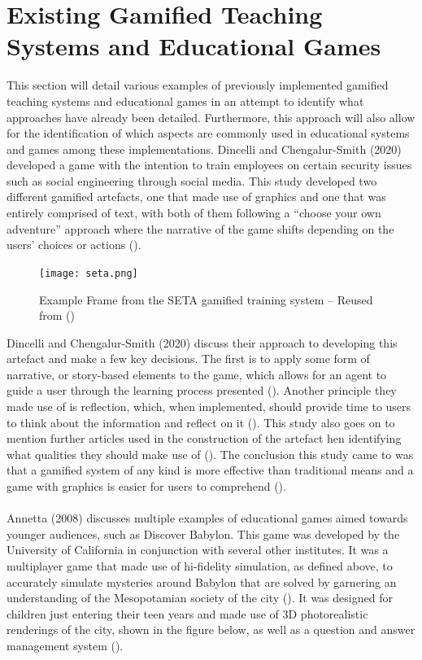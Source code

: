 \section{Existing Gamified Teaching Systems and Educational Games}
This section will detail various examples of previously implemented gamified teaching systems and educational games in an attempt to identify what approaches have already been detailed. Furthermore, this approach will also allow for the identification of which aspects are commonly used in educational systems and games among these implementations. 
\newpage
\noindent Dincelli and Chengalur-Smith (2020) developed a game with the intention to train employees on certain security issues such as social engineering through social media. This study developed two different gamified artefacts, one that made use of graphics and one that was entirely comprised of text, with both of them following a “choose your own adventure” approach where the narrative of the game shifts depending on the users’ choices or actions (\cite{Dincelli2020}).

\begin{figure}[H]
\centering
\centerline{\texttt{[image: seta.png]}}
\caption{Example Frame from the SETA gamified training system – Reused from (\cite{Dincelli2020})}
\end{figure}

\noindent Dincelli and Chengalur-Smith (2020) discuss their approach to developing this artefact and make a few key decisions. The first is to apply some form of narrative, or story-based elements to the game, which allows for an agent to guide a user through the learning process presented (\cite{Dincelli2020, Sheng2007}). Another principle they made use of is reflection, which, when implemented, should provide time to users to think about the information and reflect on it (\cite{Dincelli2020, Sheng2007}). This study also goes on to mention further articles used in the construction of the artefact hen identifying what qualities they should make use of (\cite{Dincelli2020, Liu2017}). The conclusion this study came to was that a gamified system of any kind is more effective than traditional means and a game with graphics is easier for users to comprehend (\cite{Dincelli2020}).
\\\\
Annetta (2008) discusses multiple examples of educational games aimed towards younger audiences, such as Discover Babylon. This game was developed by the University of California in conjunction with several other institutes. It was a multiplayer game that made use of hi-fidelity simulation, as defined above, to accurately simulate mysteries around Babylon that are solved by garnering an understanding of the Mesopotamian society of the city (\cite{Annetta2008}). It was designed for children just entering their teen years and made use of 3D photorealistic renderings of the city, shown in the figure below, as well as a question and answer management system (\cite{Annetta2008}). 

